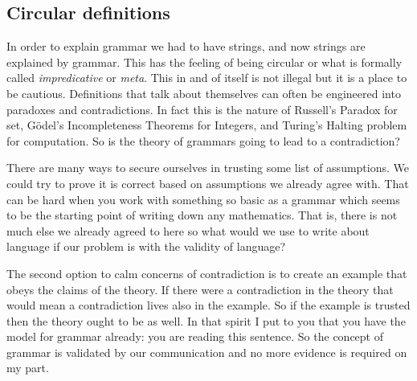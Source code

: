 \subsection{Circular definitions}
In order to explain grammar we had to have strings, and now strings are 
explained by grammar.  This has the feeling of being circular or what 
is formally called \emph{impredicative} or \emph{meta}.   This in and of 
itself is not illegal but it is a place to be cautious.  Definitions that 
talk about themselves can often be engineered into paradoxes and contradictions.  In fact this is the nature of Russell's Paradox for set,
G\"odel's Incompleteness Theorems for Integers, and Turing's Halting problem 
for computation.  So is the theory of grammars going to lead to a contradiction?

There are many ways to secure ourselves in trusting some list of assumptions.
We could try to prove it is correct based on assumptions we already agree with.
That can be hard when you work with something so basic as a grammar which seems 
to be the starting point of writing down any mathematics.  That is, there is not much else we already agreed to here so what would we use to write about language if our problem is with the validity of language?

The second option to calm concerns of contradiction is to create an example 
that obeys the claims of the theory.  If there were a contradiction in the theory that would mean a contradiction lives also in the example.  So if the 
example is trusted then the theory ought to be as well.  In that spirit I put to you that you have the model for grammar already: you are reading this 
sentence.  So the concept of grammar is validated by our communication and 
no more evidence is required on my part.